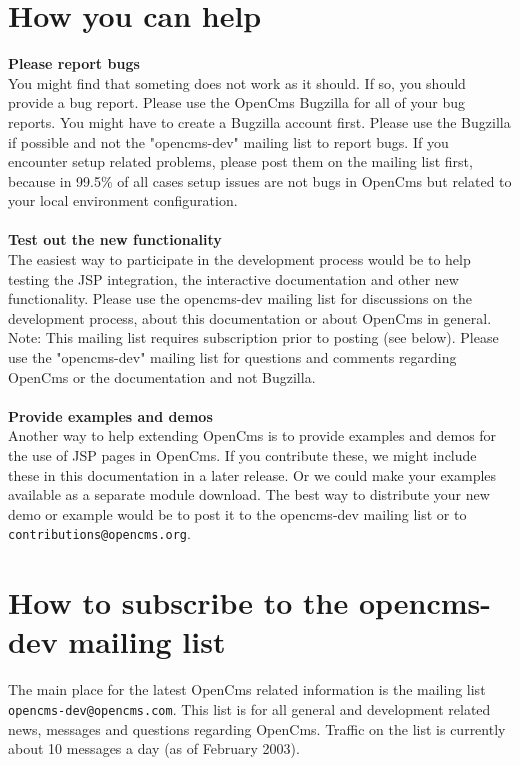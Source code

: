 \section{How you can help}
{\bf Please report bugs}\\
You might find that someting does not work as it should. If so, you should provide a bug report. 
Please use the OpenCms Bugzilla for all of your bug reports. You might have to create a Bugzilla 
account first. Please use the Bugzilla if possible and not the "opencms-dev" mailing list to report 
bugs. If you encounter setup related problems, please post them on the mailing list first, because 
in 99.5\% of all cases setup issues are not bugs in OpenCms but related to your local environment
configuration.\\
\\
{\bf Test out the new functionality}\\
The easiest way to participate in the development process would be to help testing the JSP integration, 
the interactive documentation and other new functionality. Please use the opencms-dev mailing list for 
discussions on the development process, about this documentation or about OpenCms in general. Note: This 
mailing list requires subscription prior to posting (see below). Please use the "opencms-dev" mailing list 
for questions and comments regarding OpenCms or the documentation and not Bugzilla.\\
\\
{\bf Provide examples and demos}\\
Another way to help extending OpenCms is to provide examples and demos for the use of JSP pages in OpenCms. 
If you contribute these, we might include these in this documentation in a later release. Or we could make 
your examples available as a separate module download. The best way to distribute your new demo or example 
would be to post it to the opencms-dev mailing list or to {\tt contributions@opencms.org}.

\section{How to subscribe to the opencms-dev mailing list}
The main place for the latest OpenCms related information is the mailing list\\ {\tt opencms-dev@opencms.com}. 
This list is for all general and development related news, messages and questions regarding OpenCms.
Traffic on the list is currently about 10 messages a day (as of February 2003).

